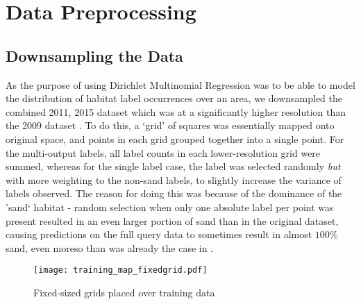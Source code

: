 \section{Data Preprocessing}

\subsection{Downsampling the Data}
As the purpose of using Dirichlet Multinomial Regression was to be able to model the distribution of habitat label occurrences over an area, we downsampled the combined 2011, 2015 dataset which was at a significantly higher resolution than the 2009 dataset . To do this, a `grid' of squares was essentially mapped onto original space, and points in each grid grouped together into a single point. For the multi-output labels, all label counts in each lower-resolution grid were summed, whereas for the single label case, the label was selected randomly \textit{but} with more weighting to the non-sand labels, to slightly increase the variance of labels observed. The reason for doing this was because of the dominance of the 'sand` habitat - random selection when only one absolute label per point was present resulted in an even larger portion of sand than in the original dataset, causing predictions on the full query data to sometimes result in almost $100\%$ sand, even moreso than was already the case in .

% 
% 
% 
\begin{figure}[H]
    \texttt{[image: training\_map\_fixedgrid.pdf]}
    \caption{Fixed-sized grids placed over training data }
    \label{fig:gridsplit}
\end{figure} 

